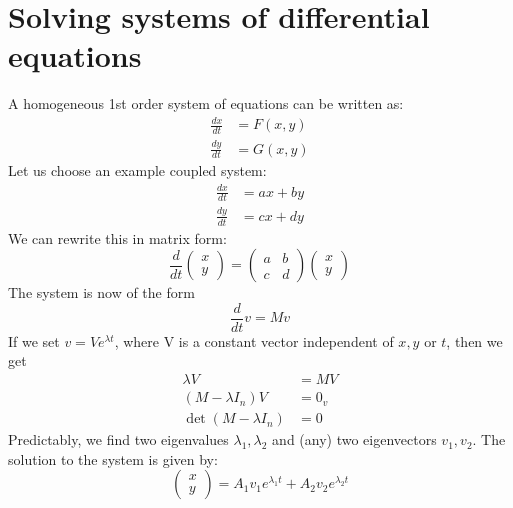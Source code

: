 \documentclass{scrartcl}
\begin{document}
\section{Solving systems of differential equations}
A homogeneous 1st order system of equations can be written as:
\begin{equation}
\begin{split}
\frac{dx}{dt} & = F(x, y) \\
\frac{dy}{dt} & = G(x, y)
\end{split}
\end{equation}
Let us choose an example coupled system:
\begin{equation}
\begin{split}
\frac{dx}{dt} & = ax + by \\
\frac{dy}{dt} & = cx + dy
\end{split}
\end{equation}
We can rewrite this in matrix form:
\begin{equation}
\frac{d}{dt}
\begin{pmatrix}
x \\
y
\end{pmatrix}
=
\begin{pmatrix}
a & b \\
c & d
\end{pmatrix}
\begin{pmatrix}
x \\
y
\end{pmatrix}
\end{equation}
The system is now of the form
\begin{equation}
\frac{d}{dt}v = Mv
\end{equation}
If we set $ v = Ve^{\lambda  t} $, where V is a constant vector independent of $ x, y $ or $ t $, then we get
\begin{equation}
\begin{split}
\lambda V & = MV \\
(M - \lambda I_{n})V & = 0_{v} \\
\det(M - \lambda I_{n}) & = 0
\end{split}
\end{equation}
Predictably, we find two eigenvalues $ \lambda_{1} ,  \lambda_{2} $ and (any) two eigenvectors $ v_{1},  v_{2} $. The solution to the system is given by:
\begin{equation}
\begin{pmatrix}
x \\
y
\end{pmatrix}
= A_{1}v_{1}e^{\lambda_{1}t} + A_{2}v_{2}e^{\lambda_{2}t}
\end{equation}
\end{document}
